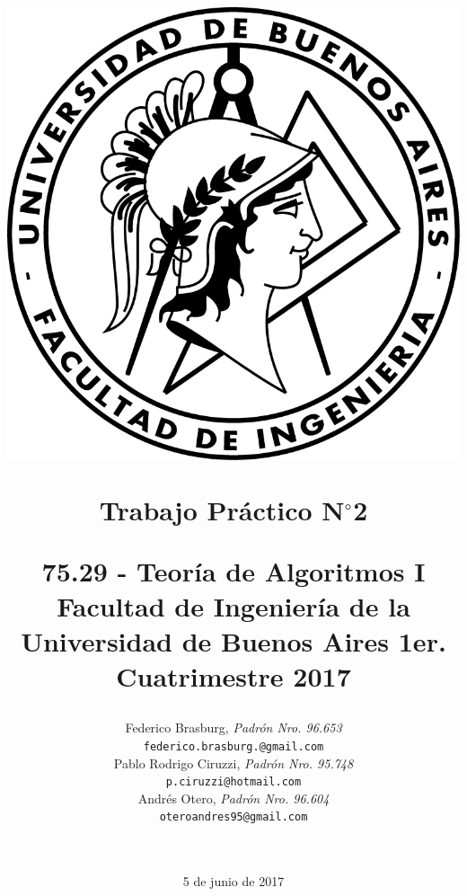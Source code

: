 \documentclass[a4paper,10pt]{article}
\begin{document}
\title{	
	\includegraphics[scale=0.8]{images/logo-fiuba.png} \\
	\begin{center}
		\textbf{Trabajo Práctico N$^{\circ}$2} \linebreak
	\end{center}
	\begin{center}
		\begin{large}
			75.29 - Teoría de Algoritmos I \linebreak
			Facultad de Ingeniería de la Universidad de Buenos Aires \linebreak
			1er. Cuatrimestre 2017 \linebreak
		\end{large}
	\end{center} 
}
\author{	Federico Brasburg, \textit{Padrón Nro. 96.653} \\
			\texttt{ federico.brasburg.@gmail.com } \\ [2.5ex]
			Pablo Rodrigo Ciruzzi, \textit{Padrón Nro. 95.748} \\
			\texttt{ p.ciruzzi@hotmail.com } \\ [2.5ex]
			Andrés Otero, \textit{Padrón Nro. 96.604 } \\
			\texttt{ oteroandres95@gmail.com } \\ [2.5ex] \\
\\
		}
\date{5 de junio de 2017}
\end{document}
